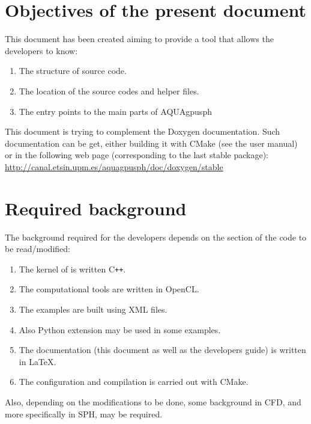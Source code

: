 \section{Objectives of the present document}
%
This document has been created aiming to provide a tool that allows the \NAME developers to know:
%
\begin{enumerate}
	\item The structure of \NAME source code.
	\item The location of the source codes and helper files.
	\item The entry points to the main parts of AQUAgpusph
\end{enumerate}
%
This document is trying to complement the Doxygen documentation.
%
Such documentation can be get, either building it with CMake (see the user manual) or in the following web page (corresponding to the last stable \NAME package):\rc
%
\url{http://canal.etsin.upm.es/aquagpusph/doc/doxygen/stable}
%
\section{Required background}
%
The background required for the developers depends on the section of the code to be read/modified:
%
\begin{enumerate}
	\item The kernel of \NAME is written C\texttt{++}.
	\item The computational tools are written in OpenCL.
	\item The examples are built using XML files.
	\item Also Python extension may be used in some examples.
	\item The documentation (this document as well as the developers guide) is written in \LaTeX.
	\item The configuration and compilation is carried out with CMake.
\end{enumerate}

Also, depending on the modifications to be done, some background in CFD, and more specifically in SPH, may be required.
%
